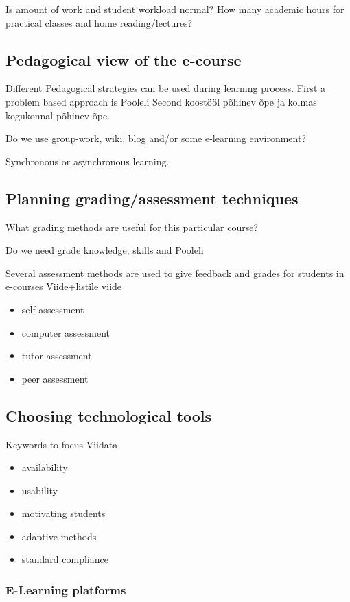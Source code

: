 Is amount of work and student workload normal? How many academic hours for practical classes and home reading/lectures?

\subsection{Pedagogical view of the e-course}
Different Pedagogical strategies can be used during learning process. First a problem based approach is {\color{red} Pooleli }
Second koostööl põhinev õpe ja kolmas kogukonnal põhinev õpe.

Do we use group-work, wiki, blog and/or some e-learning environment?

Synchronous or asynchronous learning.

\subsection{Planning grading/assessment techniques}
What grading methods are useful for this particular course?

Do we need grade knowledge, skills and {\color{red} Pooleli }

Several assessment methods are used to give feedback and grades for students in e-courses {\color{red} Viide+listile viide }

\begin{itemize}
	\item self-assessment
	\item computer assessment
	\item tutor assessment
	\item peer assessment
\end{itemize}
\subsection{Choosing technological tools}
Keywords to focus {\color{red} Viidata }
\begin{itemize}
	\item availability
	\item usability 
	\item motivating students
	\item adaptive methods
	\item standard compliance
\end{itemize}
\subsubsection{E-Learning platforms}

